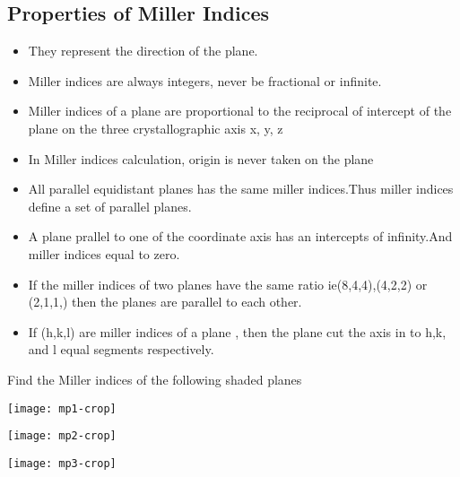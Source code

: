 \subsection{Properties of Miller Indices}
\begin{itemize}
	\item They represent the direction of the plane.
	\item Miller indices are always integers, never be fractional or infinite.
	\item Miller indices of a plane are proportional to the reciprocal of intercept of the plane on the three crystallographic axis x, y, z
	\item In Miller indices calculation, origin is never taken on the plane
	\item All parallel equidistant planes has the same miller indices.Thus miller indices define a set of parallel planes.
	\item A plane prallel to one of the coordinate axis has an intercepts of infinity.And miller indices equal to zero.
	\item If the miller indices of two planes have the same ratio ie(8,4,4),(4,2,2) or (2,1,1,) then the planes are parallel to each other.
	\item If (h,k,l) are miller indices of a plane , then the plane cut the axis in to h,k, and l equal segments respectively.
\end{itemize}
\begin{exercise}
	Find the Miller indices of the following shaded planes\\
	\begin{enumerate}
		\begin{minipage}{0.35 \textwidth}
			\item 	\texttt{[image: mp1-crop]}
		\end{minipage}	
		\begin{minipage}{0.35 \textwidth}
			\item 	\texttt{[image: mp2-crop]}
		\end{minipage}
		\begin{minipage}{0.35 \textwidth}
			\item 	\texttt{[image: mp3-crop]}
		\end{minipage}
	\end{enumerate}
\end{exercise}
